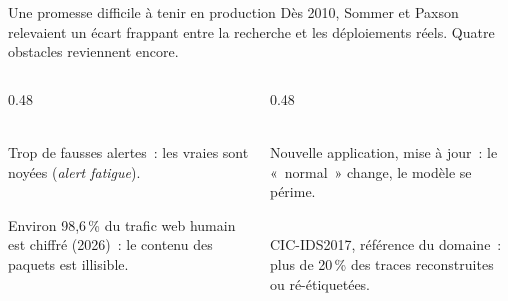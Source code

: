 \begin{frame}{Une promesse difficile à tenir en production}
  Dès 2010, Sommer et Paxson relevaient un écart frappant entre la recherche et les
  déploiements réels. Quatre obstacles reviennent encore.
  \vspace{0.25cm}
  \begin{columns}[T]
    \begin{column}{0.48\textwidth}
      \begin{carte}[height=2.15cm,valign=top]
        \\[0.05cm]
        Trop de fausses alertes~: les vraies sont noyées (\emph{alert fatigue}).
      \end{carte}
      \vspace{0.15cm}
      \begin{carte}[height=2.15cm,valign=top]
        \\[0.05cm]
        Environ 98,6\,\% du trafic web humain est chiffré (2026)~: le contenu des paquets
        est illisible.
      \end{carte}
    \end{column}
    \begin{column}{0.48\textwidth}
      \begin{carte}[height=2.15cm,valign=top]
        \\[0.05cm]
        Nouvelle application, mise à jour~: le «~normal~» change, le modèle se périme.
      \end{carte}
      \vspace{0.15cm}
      \begin{carte}[height=2.15cm,valign=top]
        \\[0.05cm]
        CIC-IDS2017, référence du domaine~: plus de 20\,\% des traces reconstruites ou
        ré-étiquetées.
      \end{carte}
    \end{column}
  \end{columns}
\end{frame}

